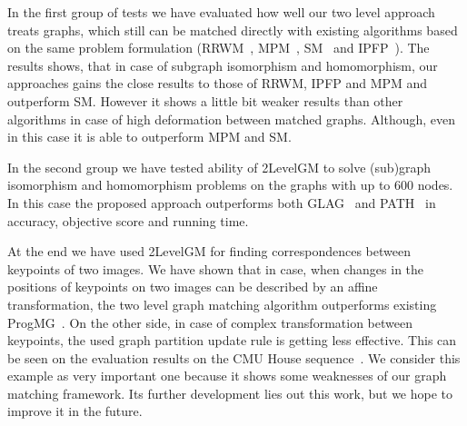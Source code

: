 In the first group of tests we have evaluated how well our two level approach treats graphs, which still can be matched directly with existing algorithms based on the same problem formulation (RRWM~\cite{Cho2010_RRWM}, MPM~\cite{Cho2014_Haystack}, SM~\cite{Leordeanu2005_SM} and IPFP~\cite{Leordeanu2009_IPFP}). The results shows, that in case of subgraph isomorphism and homomorphism, our approaches gains the close results to those of RRWM, IPFP and MPM and outperform SM. However it shows a little bit weaker results than other algorithms in case of high deformation between matched graphs. Although, even in this case it is able to outperform MPM and SM.

In the second group we have tested ability of 2LevelGM to solve (sub)graph isomorphism and homomorphism problems on the graphs with up to $600$ nodes. In this case the proposed approach outperforms both GLAG~\cite{Fiori2013_GLAG} and PATH~\cite{Zazlavskiy2008_PATH} in accuracy, objective score and running time.

At the end we have used 2LevelGM for finding correspondences between keypoints of two images. We have shown that in case, when changes in the positions of keypoints on two images can be described by an affine transformation, the two level graph matching algorithm outperforms existing ProgMG~\cite{Cho2012_ProgressiveGM}. On the other side, in case of complex transformation between keypoints, the used graph partition update rule is getting less effective. This can be seen on the evaluation results on the CMU House sequence~\cite{CMUHouse}. We consider this example as very important one because it shows some weaknesses of our graph matching framework. Its further development lies out this work, but we hope to improve it in the future.
